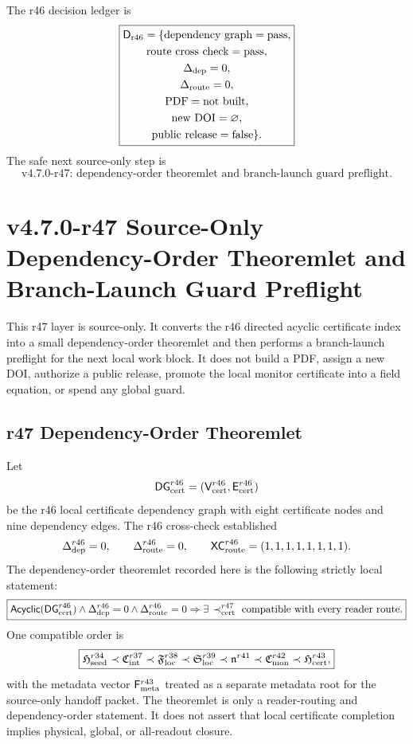 The r46 decision ledger is
\[
\boxed{
\begin{gathered}
\mathsf D_{\rm r46}
=
\{
\mathrm{dependency\ graph}=\mathrm{pass},\\
\mathrm{route\ cross\ check}=\mathrm{pass},\\
\Delta_{\rm dep}=0,\\
\Delta_{\rm route}=0,\\
\mathrm{PDF}=\mathrm{not\ built},\\
\mathrm{new\ DOI}=\varnothing,\\
\mathrm{public\ release}=\mathrm{false}
\}.
\end{gathered}
}
\]
The safe next source-only step is
\[
\boxed{
\text{v4.7.0-r47: dependency-order theoremlet and branch-launch guard preflight.}
}
\]



\section{v4.7.0-r47 Source-Only Dependency-Order Theoremlet and Branch-Launch Guard Preflight}
\label{sec:r47-dependency-order-theoremlet-branch-preflight}

This r47 layer is source-only.  It converts the r46 directed acyclic certificate
index into a small dependency-order theoremlet and then performs a branch-launch
preflight for the next local work block.  It does not build a PDF, assign a new
DOI, authorize a public release, promote the local monitor certificate into a
field equation, or spend any global guard.

\subsection{r47 Dependency-Order Theoremlet}
\label{subsec:r47-dependency-order-theoremlet}

Let
\[
\mathsf{DG}_{\rm cert}^{r46}
=
(\mathsf V_{\rm cert}^{r46},\mathsf E_{\rm cert}^{r46})
\]
be the r46 local certificate dependency graph with eight certificate nodes and
nine dependency edges.  The r46 cross-check established
\[
\Delta_{\rm dep}^{r46}=0,
\qquad
\Delta_{\rm route}^{r46}=0,
\qquad
\mathsf{XC}_{\rm route}^{r46}=(1,1,1,1,1,1,1,1).
\]
The dependency-order theoremlet recorded here is the following strictly local
statement:
\[
\boxed{
\mathsf{Acyclic}(\mathsf{DG}_{\rm cert}^{r46})
\wedge
\Delta_{\rm dep}^{r46}=0
\wedge
\Delta_{\rm route}^{r46}=0
\Rightarrow
\exists\,\prec_{\rm cert}^{r47}
\text{ compatible with every reader route.}
}
\]
One compatible order is
\[
\boxed{
\mathfrak H_{\rm seed}^{r34}
\prec
\mathfrak C_{\rm int}^{r37}
\prec
\mathfrak F_{\rm loc}^{r38}
\prec
\mathfrak S_{\rm loc}^{r39}
\prec
\mathfrak n^{r41}
\prec
\mathfrak C_{\rm mon}^{r42}
\prec
\mathfrak H_{\rm cert}^{r43},
}
\]
with the metadata vector \(\mathsf F_{\rm meta}^{r43}\) treated as a separate
metadata root for the source-only handoff packet.  The theoremlet is only a
reader-routing and dependency-order statement.  It does not assert that local
certificate completion implies physical, global, or all-readout closure.

